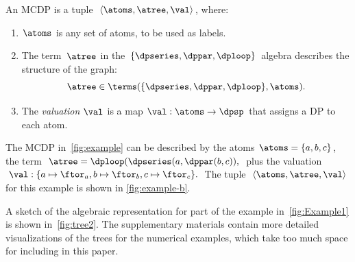 \begin{definition}
    \label{def:MCDP-algebraic}An MCDP is a tuple~$\left\langle \atoms,\atree,\val\right\rangle $,
    where:
    \begin{enumerate}
        \item $\atoms$ is any set of atoms, to be used as labels.
        \item The term~$\atree$ in the $\{\dpseries,\dppar,\dploop\}$ algebra
        describes the structure of the graph:
        \[
            \atree\in\terms(\{\dpseries,\dppar,\dploop\},\atoms).
        \]
        \item The \emph{valuation} $\val$ is a map $\val:\atoms\rightarrow\dpsp$
        that assigns a DP to each atom.
    \end{enumerate}
\end{definition}
\begin{example}
    The MCDP in~\cref{fig:example} can be described by the atoms
    $\atoms=\{a,b,c\}$, the term $\atree=\dploop(\dpseries(a,\dppar(b,c)),$
    plus the valuation $\val:\{a\mapsto\ftor_{a},b\mapsto\ftor_{b},c\mapsto\ftor_{c}\}.$
    The tuple~$\left\langle \atoms,\atree,\val\right\rangle $ for this
    example is shown in \cref{fig:example-b}.
\end{example}
\begin{example}
    A sketch of the algebraic representation for part of the example in~\cref{fig:Example1}
    is shown in~\cref{fig:tree2}. The supplementary materials contain
    more detailed visualizations of the trees for the numerical examples,
    which take too much space for including in this paper.
\end{example}
